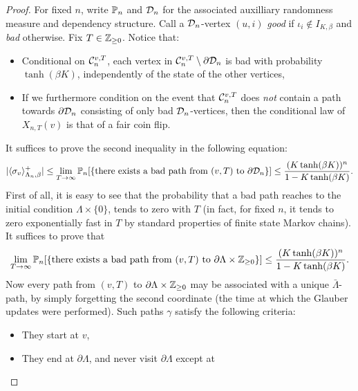 \begin{proof}
    For fixed $n$, write $\P_n$ and $\calD_n$ for the associated auxilliary randomness
    measure and dependency structure.
    Call a $\calD_n$-vertex $(u,i)$ \emph{good} if $\iota_i\not\in I_{K,\beta}$
    and \emph{bad} otherwise.
    Fix $T\in\Z_{\geq 0}$.
    Notice that:
    \begin{itemize}
        \item Conditional on $\calC^{v,T}_n$, each vertex in
            $\calC^{v,T}_n\setminus\partial\calD_n$ is bad with probability $\tanh(\beta K)$,
            independently of the state of the other vertices,
        \item If we furthermore condition on the event that $\calC^{v,T}_n$ does
            \emph{not} contain a path towards $\partial\calD_n$
            consisting of only bad $\calD_n$-vertices, then the conditional law of
            $X_{n,T}(v)$ is that of a fair coin flip.
    \end{itemize}
    It suffices to prove the second inequality in the following equation:
    \begin{equation}
        |\langle\sigma_v\rangle_{\Lambda_n,\beta}^+| \leq\lim_{T\to\infty}
        \P_n[\{\text{there exists a bad path from $(v,T)$ to $\partial\calD_n$}\}]
        \leq
        \frac{(K\tanh(\beta K))^n}{1-K\tanh(\beta K)}.
    \end{equation}
    First of all, it is easy to see that the probability that a bad path reaches to the
    initial condition $\Lambda\times\{0\}$,
    tends to zero with $T$ (in fact, for fixed $n$, it tends to zero exponentially fast
    in $T$ by standard properties of finite state Markov chains).
    It suffices to prove that
    \begin{equation}
        \lim_{T\to\infty}
        \P_n[\{\text{there exists a bad path from $(v,T)$ to $\partial\Lambda\times\Z_{\geq 0}$}\}]
        \leq
        \frac{(K\tanh(\beta K))^n}{1-K\tanh(\beta K)}.
    \end{equation}
    Now every path from $(v,T)$ to $\partial\Lambda\times\Z_{\geq 0}$ may be associated
    with a unique $\bar\Lambda$-path, by simply forgetting the second coordinate (the
    time at which the Glauber updates were performed).
    Such paths $\gamma$ satisfy the following criteria:
    \begin{itemize}
        \item They start at $v$,
        \item They end at $\partial\Lambda$, and never visit $\partial\Lambda$ except at

\end{itemize}
\end{proof}
